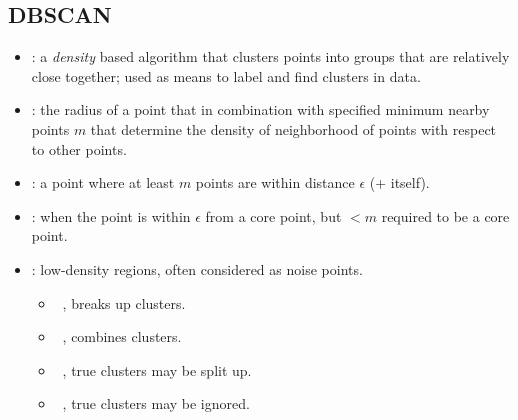 \begin{itemize}
  \subsection{DBSCAN}
  \begin{itemize}
    \item {}: a \emph{density} based \hyperref[Subsection: Parametric vs. Nonparametric]{} algorithm that clusters points into groups that are relatively close together; used as means to label and find clusters in data.
    \item {}: the radius of a point that in combination with specified minimum nearby points \(m\) that determine the density of neighborhood of points with respect to other points.
    \item {}: a point where at least \(m\) points are within distance \(\epsilon \) (+ itself).
    \item {}: when the point is within \(\epsilon \) from a core point, but \(< m\) required to be a core point.
    \item {}: low-density regions, often considered as noise points.
      \begin{center}
      \end{center}
    \medskip
      \begin{itemize}
        \item {} \to~, breaks up clusters.
        \item {} \to~, combines clusters.
        \item {} \to~, true clusters may be split up.
        \item {} \to~, true clusters may be ignored.
      \end{itemize}
  \end{itemize}


\end{itemize}

